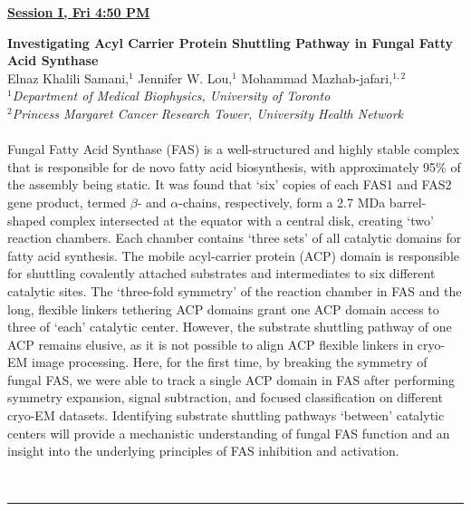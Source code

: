 \documentclass[titlepage,oneside,openany,10pt]{book}
\newenvironment{oralabs}[4] %
        {
        \begin{flushright}
                \underline{\textbf{#4}}
        \end{flushright}
        \textbf{#1}\\%
        #2\\%
        \textit{#3}\\\\%
        }
        {
        \\
        \noindent\rule{15cm}{0.5pt}%
        }
\begin{document}
\begin{oralabs}
    {Investigating Acyl Carrier Protein Shuttling Pathway in Fungal Fatty Acid Synthase}
    {Elnaz Khalili Samani,$^{1}$ Jennifer W. Lou,$^{1}$ Mohammad Mazhab-jafari,$^{1,2}$}
    {
    $^1$Department of Medical Biophysics, University of Toronto\\
    $^2$Princess Margaret Cancer Research Tower, University Health Network
    }
    {Session I, Fri 4:50 PM}
    Fungal Fatty Acid Synthase (FAS) is a well-structured and highly stable complex that is responsible for de novo fatty acid biosynthesis, with approximately 95\% of the assembly being static. It was found that `six' copies of each FAS1 and FAS2 gene product, termed $\beta$- and $\alpha$-chains, respectively, form a 2.7 MDa barrel-shaped complex intersected at the equator with a central disk, creating `two' reaction chambers. Each chamber contains `three sets' of all catalytic domains for fatty acid synthesis. The mobile acyl-carrier protein (ACP) domain is responsible for shuttling covalently attached substrates and intermediates to six different catalytic sites. The `three-fold symmetry' of the reaction chamber in FAS and the long, flexible linkers tethering ACP domains grant one ACP domain access to three of `each' catalytic center. However, the substrate shuttling pathway of one ACP remains elusive, as it is not possible to align ACP flexible linkers in cryo-EM image processing. Here, for the first time, by breaking the symmetry of fungal FAS, we were able to track a single ACP domain in FAS after performing symmetry expansion, signal subtraction, and focused classification on different cryo-EM datasets. Identifying substrate shuttling pathways `between' catalytic centers will provide a mechanistic understanding of fungal FAS function and an insight into the underlying principles of FAS inhibition and activation.
    \label{Khalili samaniE}
\end{oralabs}

\newpage
\end{document}
